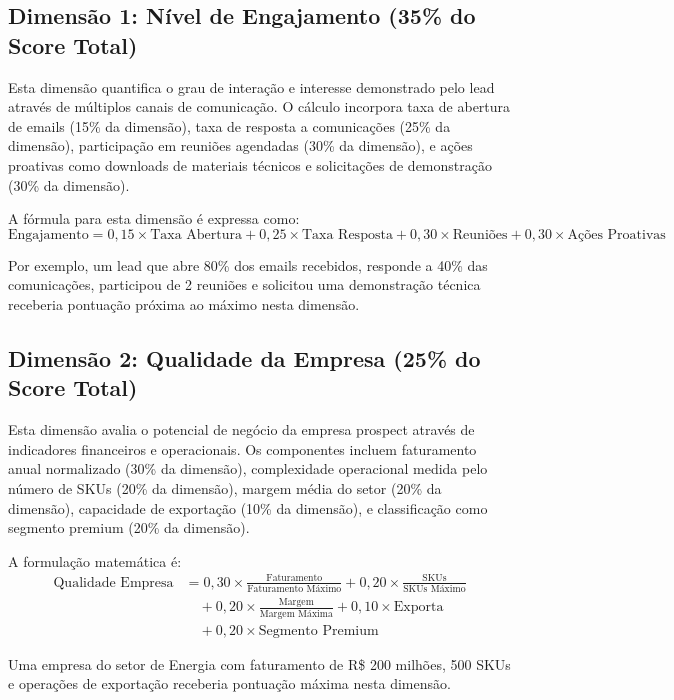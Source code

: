 \documentclass[portuguese,11pt]{article}
\begin{document}
\subsection{Dimensão 1: Nível de Engajamento (35\% do Score Total)}
Esta dimensão quantifica o grau de interação e interesse demonstrado pelo lead através de múltiplos canais de comunicação. O cálculo incorpora taxa de abertura de emails (15\% da dimensão), taxa de resposta a comunicações (25\% da dimensão), participação em reuniões agendadas (30\% da dimensão), e ações proativas como downloads de materiais técnicos e solicitações de demonstração (30\% da dimensão).

A fórmula para esta dimensão é expressa como:
\begin{equation}
\text{Engajamento} = 0,15 \times \text{Taxa Abertura} + 0,25 \times \text{Taxa Resposta} + 0,30 \times \text{Reuniões} + 0,30 \times \text{Ações Proativas}
\end{equation}

Por exemplo, um lead que abre 80\% dos emails recebidos, responde a 40\% das comunicações, participou de 2 reuniões e solicitou uma demonstração técnica receberia pontuação próxima ao máximo nesta dimensão.

\subsection{Dimensão 2: Qualidade da Empresa (25\% do Score Total)}
Esta dimensão avalia o potencial de negócio da empresa prospect através de indicadores financeiros e operacionais. Os componentes incluem faturamento anual normalizado (30\% da dimensão), complexidade operacional medida pelo número de SKUs (20\% da dimensão), margem média do setor (20\% da dimensão), capacidade de exportação (10\% da dimensão), e classificação como segmento premium (20\% da dimensão).

A formulação matemática é:
\begin{align}
\text{Qualidade Empresa} &= 0,30 \times \frac{\text{Faturamento}}{\text{Faturamento Máximo}} + 0,20 \times \frac{\text{SKUs}}{\text{SKUs Máximo}} \nonumber \\
&\quad + 0,20 \times \frac{\text{Margem}}{\text{Margem Máxima}} + 0,10 \times \text{Exporta} \nonumber \\
&\quad + 0,20 \times \text{Segmento Premium}
\end{align}

Uma empresa do setor de Energia com faturamento de R\$ 200 milhões, 500 SKUs e operações de exportação receberia pontuação máxima nesta dimensão.
\end{document}
